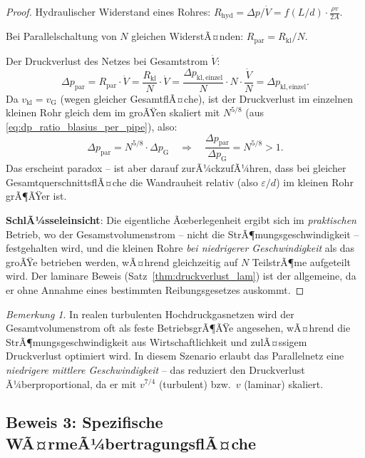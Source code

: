 ﻿\documentclass[12pt,a4paper,twoside]{article}
\theoremstyle{plain}
\theoremstyle{definition}
\theoremstyle{remark}
\newtheorem{remark}[theorem]{Bemerkung}
\begin{document}
\begin{proof}
\noindent
Hydraulischer Widerstand eines Rohres:
$R_{\mathrm{hyd}} = \Delta p / \dot{V} = f(L/d) \cdot \frac{\rho v}{2 A}$.

\noindent
Bei Parallelschaltung von $N$ gleichen WiderstÃ¤nden:
$R_{\mathrm{par}} = R_{\mathrm{kl}} / N$.

\noindent
Der Druckverlust des Netzes bei Gesamtstrom $\dot{V}$:
\begin{equation}
  \Delta p_{\mathrm{par}} = R_{\mathrm{par}} \cdot \dot{V}
    = \frac{R_{\mathrm{kl}}}{N} \cdot \dot{V}
    = \frac{\Delta p_{\mathrm{kl, einzel}}}{N} \cdot N \cdot \frac{\dot{V}}{N}
    = \Delta p_{\mathrm{kl,einzel}}.
  \label{eq:parallel_dp}
\end{equation}
Da $v_{\mathrm{kl}} = v_{\mathrm{G}}$ (wegen gleicher GesamtflÃ¤che),
ist der Druckverlust im einzelnen kleinen Rohr gleich dem im groÃŸen
skaliert mit $N^{5/8}$ (aus \cref{eq:dp_ratio_blasius_per_pipe}), also:
\begin{equation}
  \Delta p_{\mathrm{par}} = N^{5/8} \cdot \Delta p_{\mathrm{G}}
  \quad \Longrightarrow \quad
  \frac{\Delta p_{\mathrm{par}}}{\Delta p_{\mathrm{G}}} = N^{5/8} > 1.
\end{equation}
Das erscheint paradox -- ist aber darauf zurÃ¼ckzufÃ¼hren, dass bei gleicher
GesamtquerschnittsflÃ¤che die Wandrauheit relativ (also $\varepsilon/d$) im
kleinen Rohr grÃ¶ÃŸer ist.

\textbf{SchlÃ¼sseleinsicht}: Die eigentliche Ãœberlegenheit ergibt sich im
\emph{praktischen} Betrieb, wo der Gesamstvolumenstrom -- nicht die
StrÃ¶mungsgeschwindigkeit -- festgehalten wird, und die kleinen Rohre
\emph{bei niedrigerer Geschwindigkeit} als das groÃŸe betrieben werden,
wÃ¤hrend gleichzeitig auf $N$ TeilstrÃ¶me aufgeteilt wird.
Der laminare Beweis (Satz~\ref{thm:druckverlust_lam}) ist der allgemeine,
da er ohne Annahme eines bestimmten Reibungsgesetzes auskommt.
\end{proof}

\begin{remark}
In realen turbulenten Hochdruckgasnetzen wird der Gesamtvolumenstrom oft als
feste BetriebsgrÃ¶ÃŸe angesehen, wÃ¤hrend die StrÃ¶mungsgeschwindigkeit aus
Wirtschaftlichkeit und zulÃ¤ssigem Druckverlust optimiert wird.
In diesem Szenario erlaubt das Parallelnetz eine \emph{niedrigere mittlere
Geschwindigkeit} -- das reduziert den Druckverlust Ã¼berproportional, da er
mit $v^{7/4}$ (turbulent) bzw.\ $v$ (laminar) skaliert.
\end{remark}

\subsection{Beweis 3: Spezifische WÃ¤rmeÃ¼bertragungsflÃ¤che}
\label{ssec:beweis_waerme}
\end{document}
